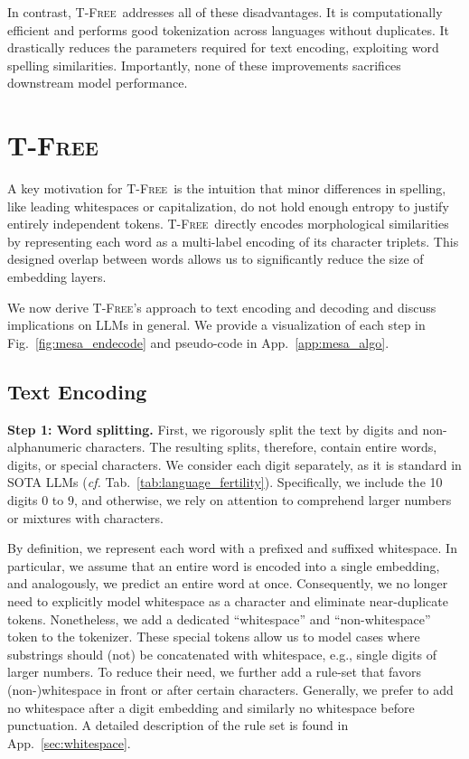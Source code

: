 \documentclass[11pt]{article}
\newcommand{\method}{\textsc{T-Free}}
\begin{document}
In contrast, \method~addresses all of these disadvantages. It is computationally efficient and performs good tokenization across languages without duplicates. It drastically reduces the parameters required for text encoding, exploiting word spelling similarities. Importantly, none of these improvements sacrifices downstream model performance.

\section{\method}
\label{sec:trigram}
A key motivation for \method~is the intuition that minor differences in spelling, like leading whitespaces or capitalization, do not hold enough entropy to justify entirely independent tokens. 
\method~directly encodes morphological similarities by representing each word as a multi-label encoding of its character triplets. This designed overlap between words allows us to significantly reduce the size of embedding layers.

We now derive \method's approach to text encoding and decoding and discuss implications on LLMs in general. We provide a visualization of each step in Fig.~\ref{fig:mesa_endecode} and pseudo-code in App.~\ref{app:mesa_algo}.

\subsection{Text Encoding}
\label{sec:encoding}
\textbf{Step 1: Word splitting.} First, we rigorously split the text by digits and non-alphanumeric characters. The resulting splits, therefore, contain entire words, digits, or special characters.
We consider each digit separately, as it is standard in SOTA LLMs (\emph{cf.} Tab.~\ref{tab:language_fertility}). Specifically, we include the 10 digits $0$ to $9$, and otherwise, we rely on attention to comprehend larger numbers or mixtures with characters.

By definition, we represent each word with a prefixed and suffixed whitespace. In particular, we assume that an entire word is encoded into a single embedding, and analogously, we predict an entire word at once.
Consequently, we no longer need to explicitly model whitespace as a character and eliminate near-duplicate tokens. 
Nonetheless, we add a dedicated ``whitespace'' and ``non-whitespace'' token to the tokenizer. These special tokens allow us to model cases where substrings should (not) be concatenated with whitespace, e.g., single digits of larger numbers. 
To reduce their need, we further add a rule-set that favors \mbox{(non-)}whitespace in front or after certain characters. Generally, we prefer to add no whitespace after a digit embedding and similarly no whitespace before punctuation.  
A detailed description of the rule set is found in App.~\ref{sec:whitespace}.
\end{document}
